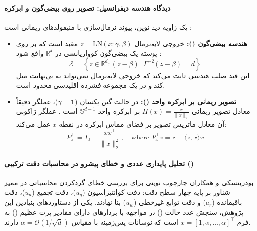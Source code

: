 \paragraph*{دیدگاه هندسه دیفرانسیل: تصویر روی بیضی‌گون و ابرکره}
یک زاویه دید نوین، پیوند نرمال‌سازی با منیفولدهای ریمانی است \cite{burger2025meanfield, kan2026stability}:
\begin{itemize}
    \item \textbf{هندسه بیضی‌گون ():} خروجی لایه‌نرمال $z = \text{LN}(x; \gamma, \beta)$ مقید است که بر روی پوسته یک بیضی‌گون کوواریانسی در $\mathbb{R}^d$ واقع شود \cite{kan2026stability}:
    \begin{equation}
        \mathcal{E} = \left\{ z \in \mathbb{R}^d : (z - \beta)^\top \Gamma^{-2} (z - \beta) = d \right\}
    \end{equation}
    این قید صلب هندسی ثابت می‌کند که خروجی لایه‌نرمال نمی‌تواند به بی‌نهایت میل کند و در یک مجموعه فشرده اقلیدسی محدود است.
    \item \textbf{تصویر ریمانی بر ابرکره واحد ():} در حالت گین یکسان ($\gamma = \mathbf{1}$)، عملگر  دقیقاً معادل تصویر ریمانی $\Pi(x) = \frac{x}{\|x\|_2}$ بر ابرکره واحد $\mathbb{S}^{d-1}$ است \cite{burger2025meanfield}. عملگر ژاکوبی آن معادل ماتریس تصویر بر فضای مماس ابرکره در نقطه $x$ عمل می‌کند:
    \begin{equation}
        P_x^\perp = I_d - \frac{xx^\top}{\|x\|_2^2}, \quad \text{where } P_x^\perp z = z - \langle z, x \rangle x
    \end{equation}
\end{itemize}

\paragraph*{تحلیل پایداری عددی و خطای پیشرو در محاسبات دقت ترکیبی () \cite{budzinskiy2026numerical}}
بودزینسکی و همکاران چارچوب نوینی برای بررسی خطای گردکردن محاسباتی در ممیز شناور بر پایه چهار سطح دقت: دقت کوانتیزاسیون ($u_q$)، دقت تجمیع ($u_a$)، دقت باقیمانده ($u_r$) و دقت توابع غیرخطی ($u_w$) بنا نهادند. یکی از دستاوردهای بنیادین این پژوهش، سنجش عدد حالت () در مواجهه با بردارهای دارای مقادیر پرت عظیم () به فرم $x = [1, \alpha, \dots, \alpha]^\top$ است که نوسانات پس‌زمینه با مقیاس $\alpha = \mathcal{O}(1/\sqrt{d})$ دارند.

